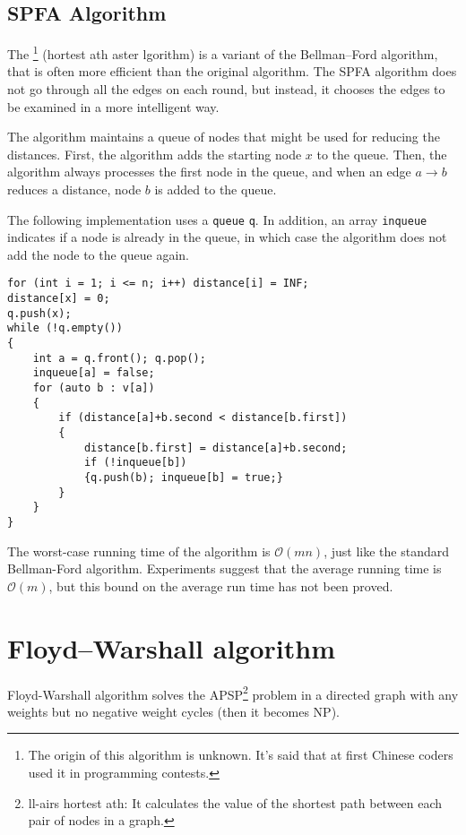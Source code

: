 \documentclass[twoside,12pt,a4paper,english]{book}
\theoremstyle{definition}
\theoremstyle{problemstyle}
\theoremstyle{problemstyle}
\theoremstyle{problemstyle}
\begin{document}
\section{SPFA Algorithm}

The \footnote{The origin of this algorithm is unknown. It's said that at first Chinese coders used it in programming contests.} (hortest ath aster lgorithm)
is a variant of the Bellman–Ford algorithm,
that is often more efficient than the original algorithm.
The SPFA algorithm does not go through all the edges on each round,
but instead, it chooses the edges to be examined
in a more intelligent way.

The algorithm maintains a queue of nodes that might
be used for reducing the distances.
First, the algorithm adds the starting node $x$
to the queue.
Then, the algorithm always processes the
first node in the queue, and when an edge
$a \rightarrow b$ reduces a distance,
node $b$ is added to the queue.

The following implementation uses a 
\texttt{queue} \texttt{q}.
In addition, an array \texttt{inqueue} indicates
if a node is already in the queue,
in which case the algorithm does not add
the node to the queue again.

\begin{lstlisting}
for (int i = 1; i <= n; i++) distance[i] = INF;
distance[x] = 0;
q.push(x);
while (!q.empty()) 
{
    int a = q.front(); q.pop();
    inqueue[a] = false;
    for (auto b : v[a]) 
    {
        if (distance[a]+b.second < distance[b.first])
        {
            distance[b.first] = distance[a]+b.second;
            if (!inqueue[b]) 
            {q.push(b); inqueue[b] = true;}
        }
    }
}
\end{lstlisting}

The worst-case running time of the algorithm is $\mathcal{O}(mn)$, just like the standard Bellman-Ford algorithm. Experiments suggest that the average running time is $\mathcal{O}(m)$, but this bound on the average run time has not been proved.

\chapter{Floyd–Warshall algorithm}

Floyd-Warshall algorithm solves the APSP\footnote{ll-airs hortest ath: It calculates the value of the shortest path between each pair of nodes in a graph.} problem in a directed graph with any weights but no negative weight cycles (then it becomes NP).
\end{document}
